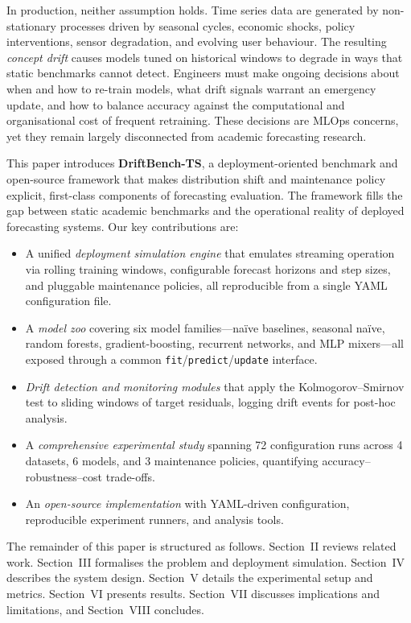 \documentclass[conference]{IEEEtran}
\begin{document}
In production, neither assumption holds. Time series data are
generated by non-stationary processes driven by seasonal cycles,
economic shocks, policy interventions, sensor degradation, and
evolving user behaviour. The resulting \textit{concept drift} causes
models tuned on historical windows to degrade in ways that static
benchmarks cannot detect. Engineers must make ongoing decisions about
when and how to re-train models, what drift signals warrant an
emergency update, and how to balance accuracy against the
computational and organisational cost of frequent retraining. These
decisions are MLOps concerns, yet they remain largely disconnected
from academic forecasting research.

This paper introduces \textbf{DriftBench-TS}, a deployment-oriented
benchmark and open-source framework that makes distribution shift and
maintenance policy explicit, first-class components of forecasting
evaluation. The framework fills the gap between static academic
benchmarks and the operational reality of deployed forecasting
systems. Our key contributions are:

\begin{itemize}
	\item A unified \textit{deployment simulation engine} that emulates
	      streaming operation via rolling training windows, configurable
	      forecast horizons and step sizes, and pluggable maintenance
	      policies, all reproducible from a single YAML configuration file.
	\item A \textit{model zoo} covering six model families---na\"{i}ve
	      baselines, seasonal na\"{i}ve, random forests, gradient-boosting,
	      recurrent networks, and MLP mixers---all exposed through a common
	      \texttt{fit}/\texttt{predict}/\texttt{update} interface.
	\item \textit{Drift detection and monitoring modules} that apply
	      the Kolmogorov--Smirnov test to sliding windows of target residuals,
	      logging drift events for post-hoc analysis.
	\item A \textit{comprehensive experimental study} spanning 72
	      configuration runs across 4 datasets, 6 models, and 3 maintenance
	      policies, quantifying accuracy--robustness--cost trade-offs.
	\item An \textit{open-source implementation} with YAML-driven
	      configuration, reproducible experiment runners, and analysis
	      tools.
\end{itemize}

The remainder of this paper is structured as follows. Section~II
reviews related work. Section~III formalises the problem and
deployment simulation. Section~IV describes the system design.
Section~V details the experimental setup and metrics. Section~VI
presents results. Section~VII discusses implications and limitations,
and Section~VIII concludes.
\end{document}
